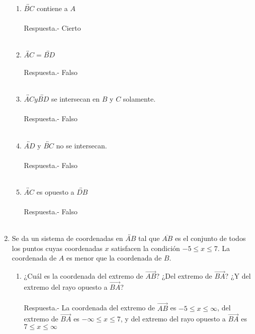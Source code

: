 \begin{enumerate}
\begin{enumerate}[\bfseries (a)]
\item $\overleftrightarrow{BC}$ contiene a $A$\\\\
Respuesta.- \; Cierto\\\\

\item $\overleftrightarrow{AC} = \overleftrightarrow{BD}$\\\\
Respuesta.- \; Falso \\\\

\item $\overleftrightarrow{AC} y \overleftrightarrow{BD}$ se intersecan en $B$ y $C$ solamente.\\\\
Respuesta.- \; Falso\\\\

\item $\overleftrightarrow{AD}$ y $\overleftrightarrow{BC}$ no se intersecan.\\\\
Respuesta.- \; Falso\\\\

\item $\overleftrightarrow{AC}$ es opuesto a $\overleftrightarrow{DB}$\\\\
Respuesta.- \; Falso\\\\
\end{enumerate}

\item Se da un sistema de coordenadas en $\overleftrightarrow{AB}$ tal que $\overline{AB}$ es el conjunto de todos los puntos cuyas coordenadas $x$ satisfacen la condición $-5\leq x \leq 7$. La coordenada de $A$ es menor que la coordenada de $B$.
\begin{enumerate}[\bfseries (a)]
\item ¿Cuál es la coordenada del extremo de $\overrightarrow{AB}$? ¿Del extremo de $\overrightarrow{BA}$? ¿Y del extremo del rayo opuesto a $\overrightarrow{BA}$?\\\\
Respuesta.- \; La coordenada del extremo de $\overrightarrow{AB}$ es $-5\leq x \leq \infty$, del extremo de $\overrightarrow{BA}$ es $- \infty \leq x \leq 7$, y del extremo del rayo opuesto a $\overrightarrow{BA}$ es $7 \leq x \leq \infty$\\\\


\end{enumerate}
\end{enumerate}
